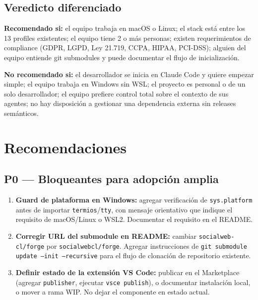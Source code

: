 \documentclass[11pt,a4paper]{article}
\begin{document}
\subsection{Veredicto diferenciado}

\textbf{Recomendado si:} el equipo trabaja en macOS o Linux; el stack está entre los 13 profiles existentes; el equipo tiene 2 o más personas; existen requerimientos de compliance (GDPR, LGPD, Ley 21.719, CCPA, HIPAA, PCI-DSS); alguien del equipo entiende git submodules y puede documentar el flujo de inicialización.

\textbf{No recomendado si:} el desarrollador se inicia en Claude Code y quiere empezar simple; el equipo trabaja en Windows sin WSL; el proyecto es personal o de un solo desarrollador; el equipo prefiere control total sobre el contexto de sus agentes; no hay disposición a gestionar una dependencia externa sin releases semánticos.

\section{Recomendaciones}

\subsection{P0 — Bloqueantes para adopción amplia}

\begin{enumerate}[leftmargin=1.5em]
  \item \textbf{Guard de plataforma en Windows:} agregar verificación de \texttt{sys.platform} antes de importar \texttt{termios}/\texttt{tty}, con mensaje orientativo que indique el requisito de macOS/Linux o WSL2. Documentar el requisito en el README.
  
  \item \textbf{Corregir URL del submodule en README:} cambiar \texttt{socialweb-cl/forge} por \texttt{socialwebcl/forge}. Agregar instrucciones de \texttt{git submodule update --init --recursive} para el flujo de clonación de repositorio existente.
  
  \item \textbf{Definir estado de la extensión VS Code:} publicar en el Marketplace (agregar \texttt{publisher}, ejecutar \texttt{vsce publish}), o documentar instalación local, o mover a rama WIP. No dejar el componente en estado actual.
\end{enumerate}
\end{document}
